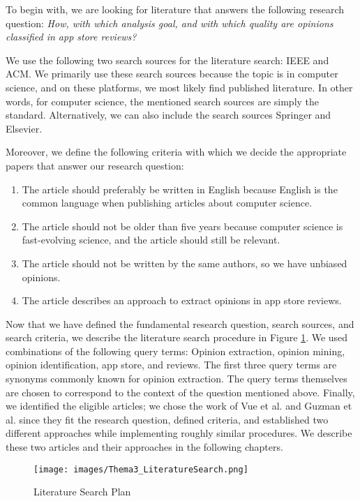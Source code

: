 To begin with, we are looking for literature that answers the following research question: \textit{How, with which analysis goal, and with which quality are opinions classified in app store reviews?}

We use the following two search sources for the literature search: IEEE and ACM. We primarily use these search sources because the topic is in computer science, and on these platforms, we most likely find published literature. In other words, for computer science, the mentioned search sources are simply the standard. Alternatively, we can also include the search sources Springer and Elsevier.

Moreover, we define the following criteria with which we decide the appropriate papers that answer our research question:

\begin{enumerate}
    \item The article should preferably be written in English because English is the common language when publishing articles about computer science.
    \item The article should not be older than five years because computer science is fast-evolving science, and the article should still be relevant.
    \item The article should not be written by the same authors, so we have unbiased opinions.
    \item The article describes an approach to extract opinions in app store reviews.
\end{enumerate}

Now that we have defined the fundamental research question, search sources, and search criteria, we describe the literature search procedure in Figure \ref{fig:literatureSearchPlan}. We used combinations of the following query terms: Opinion extraction, opinion mining, opinion identification, app store, and reviews. The first three query terms are synonyms commonly known for opinion extraction. The query terms themselves are chosen to correspond to the context of the question mentioned above. Finally, we identified the eligible articles; we chose the work of Vue et al. \cite{Vu} and Guzman et al. \cite{Guzman} since they fit the research question, defined criteria, and established two different approaches while implementing roughly similar procedures. We describe these two articles and their approaches in the following chapters.

\begin{figure}
\centering
\texttt{[image: images/Thema3\_LiteratureSearch.png]}
\caption{Literature Search Plan}
\label{fig:literatureSearchPlan}
\end{figure}

